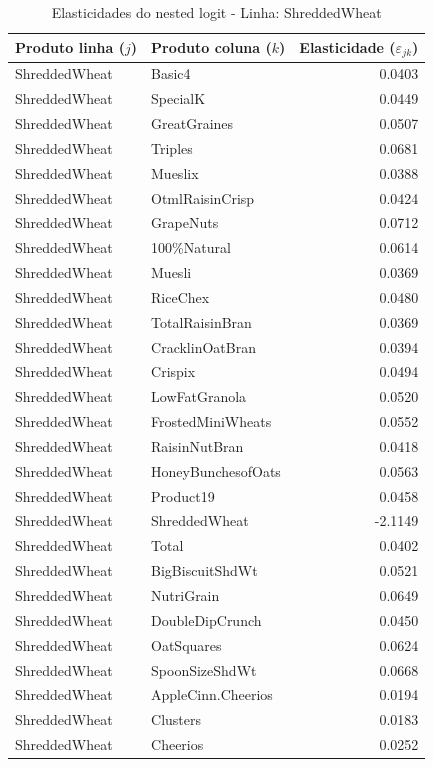 \begingroup
\begin{table}[H]
\centering
\caption{Elasticidades do nested logit - Linha: ShreddedWheat}
\label{tab:elas-nested-shreddedwheat}
\small
\begin{tabular}{llr}
\toprule
Produto linha ($j$) & Produto coluna ($k$) & Elasticidade ($\varepsilon_{jk}$) \\
\midrule
ShreddedWheat & Basic4 & 0.0403 \\
ShreddedWheat & SpecialK & 0.0449 \\
ShreddedWheat & GreatGraines & 0.0507 \\
ShreddedWheat & Triples & 0.0681 \\
ShreddedWheat & Mueslix & 0.0388 \\
ShreddedWheat & OtmlRaisinCrisp & 0.0424 \\
ShreddedWheat & GrapeNuts & 0.0712 \\
ShreddedWheat & 100\%Natural & 0.0614 \\
ShreddedWheat & Muesli & 0.0369 \\
ShreddedWheat & RiceChex & 0.0480 \\
ShreddedWheat & TotalRaisinBran & 0.0369 \\
ShreddedWheat & CracklinOatBran & 0.0394 \\
ShreddedWheat & Crispix & 0.0494 \\
ShreddedWheat & LowFatGranola & 0.0520 \\
ShreddedWheat & FrostedMiniWheats & 0.0552 \\
ShreddedWheat & RaisinNutBran & 0.0418 \\
ShreddedWheat & HoneyBunchesofOats & 0.0563 \\
ShreddedWheat & Product19 & 0.0458 \\
ShreddedWheat & ShreddedWheat & -2.1149 \\
ShreddedWheat & Total & 0.0402 \\
ShreddedWheat & BigBiscuitShdWt & 0.0521 \\
ShreddedWheat & NutriGrain & 0.0649 \\
ShreddedWheat & DoubleDipCrunch & 0.0450 \\
ShreddedWheat & OatSquares & 0.0624 \\
ShreddedWheat & SpoonSizeShdWt & 0.0668 \\
ShreddedWheat & AppleCinn.Cheerios & 0.0194 \\
ShreddedWheat & Clusters & 0.0183 \\
ShreddedWheat & Cheerios & 0.0252 \\

\end{tabular}
\end{table}
